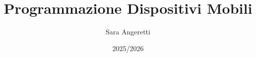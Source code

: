 \documentclass[10pt, a4paper, openany]{book}
\begin{document}
\title{Programmazione Dispositivi Mobili}

\author{Sara Angeretti}

\date{2025/2026}

\maketitle

\tableofcontents






















\end{document}
